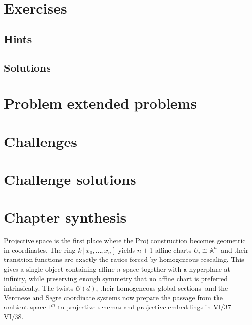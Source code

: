 \section{Exercises}


\ifdefined\IncludeExerciseHints
\subsection*{Hints}

\fi

\ifdefined\IncludeExerciseSolutions
\subsection*{Solutions}

\fi

\section{Problem extended problems}


\section{Challenges}


\ifdefined\IncludeChallengeSolutions
\section{Challenge solutions}

\fi

\section*{Chapter synthesis}
Projective space is the first place where the Proj construction becomes geometric in coordinates.  The ring \(k[x_0,\ldots,x_n]\) yields \(n+1\) affine charts \(U_i\cong\mathbb A^n\), and their transition functions are exactly the ratios forced by homogeneous rescaling.  This gives a single object containing affine \(n\)-space together with a hyperplane at infinity, while preserving enough symmetry that no affine chart is preferred intrinsically.  The twists \(\mathcal O(d)\), their homogeneous global sections, and the Veronese and Segre coordinate systems now prepare the passage from the ambient space \(\mathbb P^n\) to projective schemes and projective embeddings in VI/37--VI/38.
